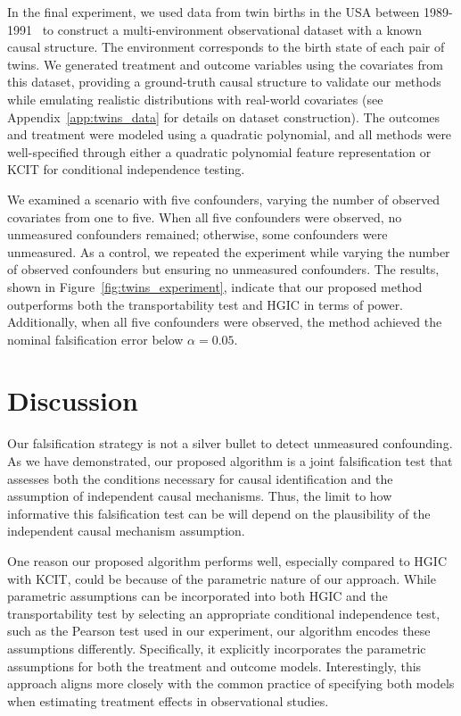 \documentclass{article}
\begin{document}
In the final experiment, we used data from twin births in the USA between 1989-1991~\citep{almond2005costs} to construct a multi-environment observational dataset with a known causal structure. The environment corresponds to the birth state of each pair of twins. We generated treatment and outcome variables using the covariates from this dataset, providing a ground-truth causal structure to validate our methods while emulating realistic distributions with real-world covariates (see Appendix~\ref{app:twins_data} for details on dataset construction). The outcomes and treatment were modeled using a quadratic polynomial, and all methods were well-specified through either a quadratic polynomial feature representation or KCIT for conditional independence testing.

We examined a scenario with five confounders, varying the number of observed covariates from one to five. When all five confounders were observed, no unmeasured confounders remained; otherwise, some confounders were unmeasured. As a control, we repeated the experiment while varying the number of observed confounders but ensuring no unmeasured confounders. The results, shown in Figure~\ref{fig:twins_experiment}, indicate that our proposed method outperforms both the transportability test and HGIC in terms of power. Additionally, when all five confounders were observed, the method achieved the nominal falsification error below
$\alpha=0.05$.

\section{Discussion}

Our falsification strategy is not a silver bullet to detect unmeasured confounding. As we have demonstrated, our proposed algorithm is a joint falsification test that assesses both the conditions necessary for causal identification and the assumption of independent causal mechanisms. Thus, the limit to how informative this falsification test can be will depend on the plausibility of the independent causal mechanism assumption. 

One reason our proposed algorithm performs well, especially compared to HGIC with KCIT, could be because of the parametric nature of our approach. While parametric assumptions can be incorporated into both HGIC and the transportability test by selecting an appropriate conditional independence test, such as the Pearson test used in our experiment, our algorithm encodes these assumptions differently. Specifically, it explicitly incorporates the parametric assumptions for both the treatment and outcome models.  Interestingly, this approach aligns more closely with the common practice of specifying both models when estimating treatment effects in observational studies.
\end{document}
